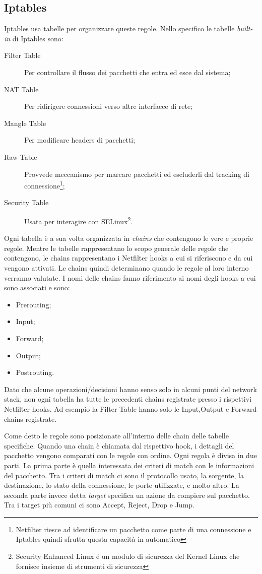 \subsection{Iptables}
\label{iptables}
Iptables usa tabelle per organizzare queste regole. Nello specifico le tabelle \textit{built-in} di Iptables sono:
\begin{description}
    \item[Filter Table] Per controllare il flusso dei pacchetti che entra ed esce dal sistema;
    \item[NAT Table] Per ridirigere connessioni verso altre interfacce di rete;
    \item[Mangle Table] Per modificare headers di pacchetti;
    \item[Raw Table] Provvede meccanismo per marcare pacchetti ed escluderli dal tracking di connessione\footnote{ Netfilter  riesce ad identificare un pacchetto come parte di una connessione e Iptables quindi sfrutta questa capacità in automatico};
    \item[Security Table] Usata per interagire con SELinux\footnote{Security Enhanced Linux é un modulo di sicurezza del Kernel Linux che fornisce insieme di strumenti di sicurezza}.
\end{description}
Ogni tabella è a sua volta organizzata in \textit{chains} che contengono le vere e proprie regole. Mentre le tabelle rappresentano lo scopo generale delle regole che contengono, le chains rappresentano i Netfilter hooks a cui si riferiscono e da cui vengono attivati. Le chains quindi determinano quando le regole al loro interno verranno valutate.
I nomi delle chains fanno riferimento ai nomi degli hooks a cui sono associati e sono:
\begin{itemize}
    \item Prerouting;
    \item Input;
    \item Forward;
    \item Output;
    \item Postrouting.
\end{itemize}

Dato che alcune operazioni/decisioni hanno senso solo in alcuni punti del network stack, non ogni tabella ha tutte le precedenti chains registrate presso i rispettivi Netfilter hooks. Ad esempio la Filter Table hanno solo le Input,Output e Forward chains registrate.

Come detto le regole sono posizionate all'interno delle chain delle tabelle specifiche. Quando una chain è chiamata dal rispettivo hook, i dettagli del pacchetto vengono comparati con le regole con ordine. Ogni regola è divisa in due parti.
La prima parte è quella interessata dei criteri di match con le informazioni del pacchetto. Tra i criteri di match ci sono il protocollo usato, la sorgente, la destinazione, lo  stato della connessione, le porte utilizzate, e molto altro.
La seconda parte invece detta \textit{target} specifica un azione da compiere sul pacchetto. Tra i target più comuni ci sono Accept, Reject, Drop e Jump.

